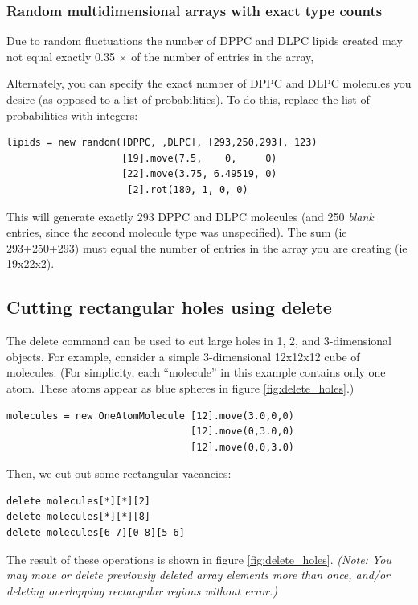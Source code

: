 \documentclass[11pt]{article}
\begin{document}
\subsubsection{Random multidimensional arrays with exact type counts}
\label{sec:random_multidim_exact}
Due to random fluctuations the number of DPPC and DLPC lipids created 
may not equal exactly 0.35 $\times$ of the number of entries in the array,

Alternately, you can specify the exact number of DPPC and DLPC molecules
you desire (as opposed to a list of probabilities).
To do this, replace the list of probabilities with integers:
\begin{verbatim}
lipids = new random([DPPC, ,DLPC], [293,250,293], 123)
                    [19].move(7.5,    0,     0)
                    [22].move(3.75, 6.49519, 0)
                     [2].rot(180, 1, 0, 0)     
\end{verbatim}
This will generate exactly 293 DPPC and DLPC molecules
(and 250 \textit{blank} entries, 
since the second molecule type was unspecified).
The sum (ie 293+250+293) must equal the number of entries in the 
array you are creating (ie 19x22x2).

\subsection{Cutting rectangular holes using \textbf{delete}}
\label{sec:delete_holes}
The delete command can be used to cut large holes in 
1, 2, and 3-dimensional objects.
For example, consider a simple 3-dimensional 12x12x12 cube of molecules.
(For simplicity, each ``molecule'' in this example contains only one atom.
 These atoms appear as blue spheres in figure \ref{fig:delete_holes}.)
\begin{verbatim}
molecules = new OneAtomMolecule [12].move(3.0,0,0)
                                [12].move(0,3.0,0)
                                [12].move(0,0,3.0)
\end{verbatim}
Then, we cut out some rectangular vacancies:
\begin{verbatim}
delete molecules[*][*][2]      
delete molecules[*][*][8]      
delete molecules[6-7][0-8][5-6]
\end{verbatim}
The result of these operations is shown in figure
\ref{fig:delete_holes}.
\textit{(Note: You may move or delete previously deleted array elements
         more than once, and/or deleting overlapping rectangular regions
         without error.)}
\end{document}
